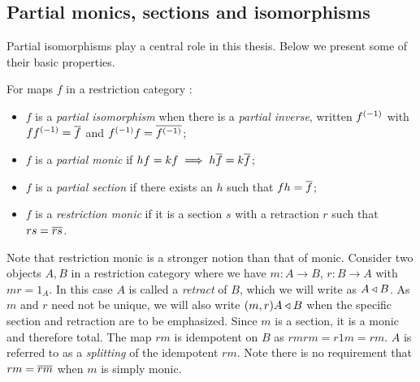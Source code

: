 \subsection{Partial monics, sections and isomorphisms} %
\label{sub:restricted_monics_sections_and_partial_isomorphisms}

Partial isomorphisms play a central role in this thesis. Below we present
some of their basic properties.

\begin{definition}
  For maps $f$ in a restriction category \X:
  \begin{itemize}
    \item $f$ is a \emph{partial isomorphism} when there is a \emph{partial inverse}, written
      ${f}^{(-1)}$ with $f{f}^{(-1)} =\overline{f}$ and ${f}^{(-1)}f = \overline{{f}^{(-1)}}$;
    \item $f$ is a \emph{partial monic} if $h f = k f \implies h \overline{f} = k \overline{f}$;
    \item $f$ is a \emph{partial section} if there exists an  $h$ such that $f h = \overline{f}$;
    \item $f$ is a \emph{restriction monic} if it is a section $s$ with a retraction
      $r$ such that $r s = \overline{r s}$.
  \end{itemize}
\end{definition}

Note that restriction monic is a stronger notion than that of monic. Consider two objects $A, B$
in a restriction category where we have $m: A\to B$, $r:B \to A$ with $m r = 1_A$. In this case
$A$ is called a \emph{retract} of $B$, which we will write as $A\triangleleft B$. As $m$ and $r$ need
not be unique, we will also write $(m,r) A \triangleleft B$ when the specific section and retraction
are to be emphasized. Since $m$ is a section,
it is a monic and therefore total. The map $r m$ is idempotent on $B$ as $r m r m = r 1 m = r m$.
$A$ is referred to as a \emph{splitting} of the idempotent $r m$. Note there is no requirement that
$r m = \overline{r m}$ when $m$ is simply monic.

